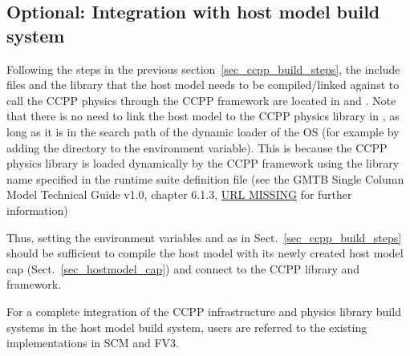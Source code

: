 \subsection{Optional: Integration with host model build system}
Following the steps in the previous section~\ref{sec_ccpp_build_steps}, the include files and the library  that the host model needs to be compiled/linked against to call the CCPP physics through the CCPP framework are located in  and . Note that there is no need to link the host model to the CCPP physics library in , as long as it is in the search path of the dynamic loader of the OS (for example by adding the directory  to the  environment variable). This is because the CCPP physics library is loaded dynamically by the CCPP framework using the library name specified in the runtime suite definition file (see the GMTB Single Column Model Technical Guide v1.0, chapter 6.1.3, {\red\url{URL MISSING}} for further information)

Thus, setting the environment variables  and  as in Sect.~\ref{sec_ccpp_build_steps} should be sufficient to compile the host model with its newly created host model cap (Sect.~\ref{sec_hostmodel_cap}) and connect to the CCPP library and framework.

For a complete integration of the CCPP infrastructure and physics library build systems in the host model build system, users are referred to the existing implementations in SCM and FV3.